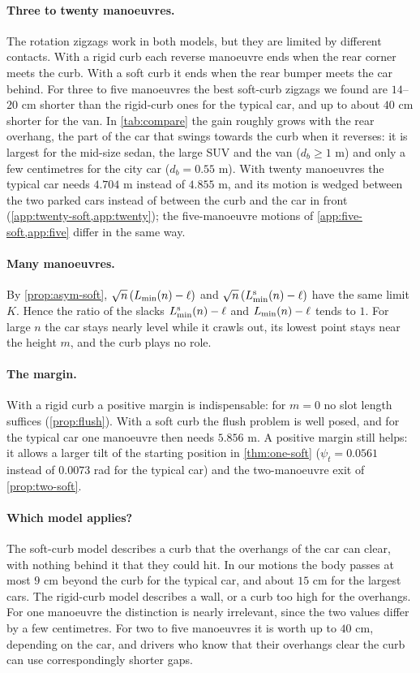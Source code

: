\paragraph{Three to twenty manoeuvres.}
The rotation zigzags work in both models, but they are limited by different contacts.
With a rigid curb each reverse manoeuvre ends when the rear corner meets the curb.
With a soft curb it ends when the rear bumper meets the car behind.
For three to five manoeuvres the best soft-curb zigzags we found are $14$--$20$ cm shorter than the rigid-curb ones for the typical car, and up to about $40$ cm shorter for the van.
In \cref{tab:compare} the gain roughly grows with the rear overhang, the part of the car that swings towards the curb when it reverses: it is largest for the mid-size sedan, the large SUV and the van ($d_b\ge1$ m) and only a few centimetres for the city car ($d_b=0.55$ m).
With twenty manoeuvres the typical car needs $4.704$ m instead of $4.855$ m, and its motion is wedged between the two parked cars instead of between the curb and the car in front (\cref{app:twenty-soft,app:twenty}); the five-manoeuvre motions of \cref{app:five-soft,app:five} differ in the same way.

\paragraph{Many manoeuvres.}
By \cref{prop:asym-soft}, $\sqrt n\,(L_{\min}(n)-\ell)$ and $\sqrt n\,(L^{\mathrm s}_{\min}(n)-\ell)$ have the same limit $K$.
Hence the ratio of the slacks $L^{\mathrm s}_{\min}(n)-\ell$ and $L_{\min}(n)-\ell$ tends to $1$.
For large $n$ the car stays nearly level while it crawls out, its lowest point stays near the height $m$, and the curb plays no role.

\paragraph{The margin.}
With a rigid curb a positive margin is indispensable: for $m=0$ no slot length suffices (\cref{prop:flush}).
With a soft curb the flush problem is well posed, and for the typical car one manoeuvre then needs $5.856$ m.
A positive margin still helps: it allows a larger tilt of the starting position in \cref{thm:one-soft} ($\psi_t=0.0561$ instead of $0.0073$ rad for the typical car) and the two-manoeuvre exit of \cref{prop:two-soft}.

\paragraph{Which model applies?}
The soft-curb model describes a curb that the overhangs of the car can clear, with nothing behind it that they could hit.
In our motions the body passes at most $9$ cm beyond the curb for the typical car, and about $15$ cm for the largest cars.
The rigid-curb model describes a wall, or a curb too high for the overhangs.
For one manoeuvre the distinction is nearly irrelevant, since the two values differ by a few centimetres.
For two to five manoeuvres it is worth up to $40$ cm, depending on the car, and drivers who know that their overhangs clear the curb can use correspondingly shorter gaps.

